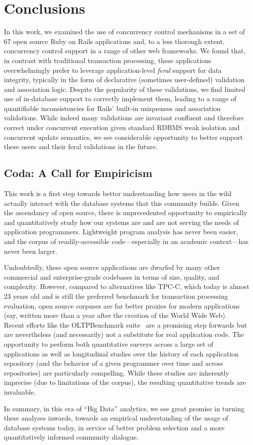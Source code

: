 
\section{Conclusions}
\label{sec:conclusion}

In this work, we examined the use of concurrency control mechanisms in
a set of 67 open source Ruby on Rails applications and, to a less
thorough extent, concurrency control support in a range of other web
frameworks. We found that, in contrast with traditional transaction
processing, these applications overwhelmingly prefer to leverage
application-level \textit{feral} support for data integrity, typically
in the form of declarative (sometimes user-defined) validation and
association logic. Despite the popularity of these validations, we
find limited use of in-database support to correctly implement them,
leading to a range of quantifiable inconsistencies for Rails' built-in
uniqueness and association validations. While indeed many validations
are invariant confluent and therefore correct under concurrent
execution given standard RDBMS weak isolation and concurrent update
semantics, we see considerable opportunity to better support these
users and their feral validations in the future.


\subsection*{Coda: A Call for Empiricism}

This work is a first step towards better understanding how users in
the wild actually interact with the database systems that this
community builds. Given the ascendancy of open source, there is
unprecedented opportunity to empirically and quantitatively study how
our systems are and are not serving the needs of application
programmers. Lightweight program analysis has never been easier, and
the corpus of readily-accessible code---especially in an academic
context---has never been larger.

Undoubtedly, these open source applications are dwarfed by many other
commercial and enterprise-grade codebases in terms of size, quality,
and complexity. However, compared to alternatives like TPC-C, which
today is almost 23 years old and is still the preferred benchmark for
transaction processing evaluation, open source corpuses are far better
proxies for modern applications (say, written more than a year after
the creation of the World Wide Web). Recent efforts like the
OLTPBenchmark suite~\cite{oltpbench} are a promising step forwards but
are nevertheless (and necessarily) not a substitute for real
application code. The opportunity to perform both quantitative surveys
across a large set of applications as well as longitudinal studies
over the history of each application repository (and the behavior of a
given programmer over time and across repositories) are particularly
compelling. While these studies are inherently imprecise (due to
limitations of the corpus), the resulting quantitative trends are
invaluable.

In summary, in this era of ``Big Data'' analytics, we see great
promise in turning these analyses inwards, towards an empirical
understanding of the usage of database systems today, in service of
better problem selection and a more quantitatively informed community
dialogue.

